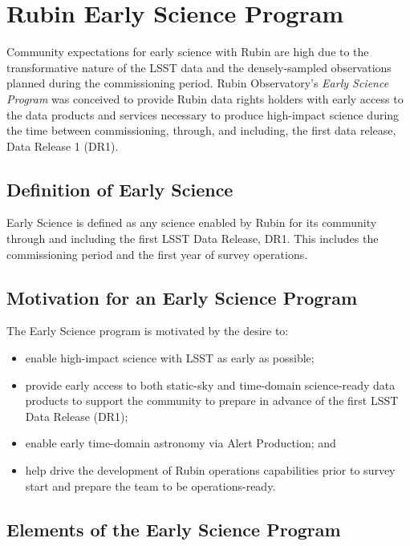 \section{Rubin Early Science Program}

Community expectations for early science with Rubin are high due to the transformative nature of the LSST data and the densely-sampled observations planned during the commissioning period.
Rubin Observatory's \emph{Early Science Program} was conceived to provide Rubin data rights holders with early access to the data products and services necessary to produce high-impact  science during the  time between commissioning, through, and including, the first data release, Data Release 1 (DR1). 

\subsection{Definition of Early Science}  \label{ssec:defn}
Early Science is defined as any science enabled by Rubin for its community through and including the first LSST Data Release, DR1.
 This includes the commissioning period and the first year of survey operations.

\subsection{Motivation for an Early Science Program}  \label{ssec:motivation}

The Early Science program is motivated by the desire to:
\begin{itemize}
\item enable high-impact science with LSST as early as possible;
\item provide early access to both static-sky and time-domain science-ready data products to support the community to prepare in advance of the first LSST Data Release (DR1);
\item enable early time-domain astronomy via Alert Production; and 
\item help drive the development of Rubin operations capabilities prior to survey start and prepare the team to be operations-ready.
\end{itemize}

\subsection{Elements of the Early Science Program}

